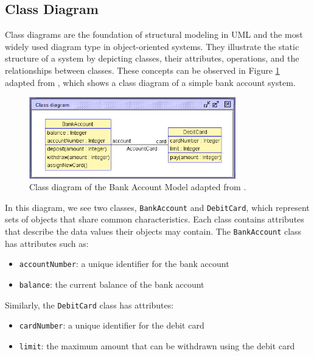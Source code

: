 \subsection{Class Diagram}
\hspace{1cm} Class diagrams are the foundation of structural modeling in UML and the most widely 
used diagram type in object-oriented systems. They illustrate the static structure 
of a system by depicting classes, their attributes, operations, and the relationships 
between classes. These concepts can be observed in Figure 
\ref{fig:class_diagram_bank_account_model} adapted from \cite{TPV}, 
which shows a class diagram of a simple bank account system.

\begin{figure}[H]
    \begin{center}
        \includegraphics[width=0.8\textwidth]{figures/c1/BankAccount/BankAccount_ClassDiagram.png}
        \caption{Class diagram of the Bank Account Model adapted from \cite{TPV}.}
        \label{fig:class_diagram_bank_account_model}
    \end{center}
\end{figure}

In this diagram, we see two classes, \texttt{BankAccount} and \texttt{DebitCard}, 
which represent sets of objects that share common characteristics. Each class 
contains attributes that describe the data values their objects may contain. 
The \texttt{BankAccount} class has attributes such as:
\begin{itemize}
    \item \texttt{accountNumber}: a unique identifier for the bank account
    \item \texttt{balance}: the current balance of the bank account
\end{itemize}
Similarly, the \texttt{DebitCard} class has attributes:
\begin{itemize}
    \item \texttt{cardNumber}: a unique identifier for the debit card
    \item \texttt{limit}: the maximum amount that can be withdrawn using the debit card
\end{itemize}

